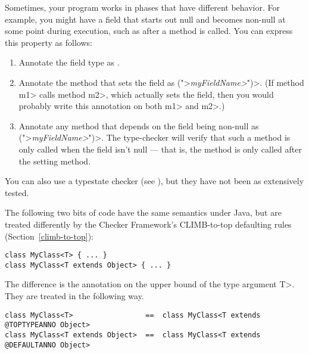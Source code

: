 


Sometimes, your program works in phases that have different behavior.  For
example, you might have a field that starts out null and becomes non-null
at some point during execution, such as after a method is called.  You can
express this property as follows:

\begin{enumerate}
\item
Annotate the field type as .
\item
Annotate the method that sets the field as \<(">\emph{\<myFieldName>}\<")>.
(If method \<m1> calls method \<m2>, which actually sets the field, then
you would probably write this annotation on both \<m1> and \<m2>.)
\item
Annotate any method that depends on the field being non-null as
\<(">\emph{\<myFieldName>}\<")>.
The type-checker will verify that such a method is only called when the
field isn't null --- that is, the method is only called after the setting
method.
\end{enumerate}

You can also use a typestate checker (see
), but they have not been as extensively
tested.



The following two bits of code have the same semantics under Java, but are
treated differently by the Checker Framework's CLIMB-to-top defaulting
rules (Section~\ref{climb-to-top}):

\begin{Verbatim}
class MyClass<T> { ... }
class MyClass<T extends Object> { ... }
\end{Verbatim}

The difference is the annotation on the upper bound of the type argument
\<T>.  They are treated in the following way.

\begin{Verbatim}
class MyClass<T>                 ==  class MyClass<T extends @TOPTYPEANNO Object>
class MyClass<T extends Object>  ==  class MyClass<T extends @DEFAULTANNO Object>
\end{Verbatim}

